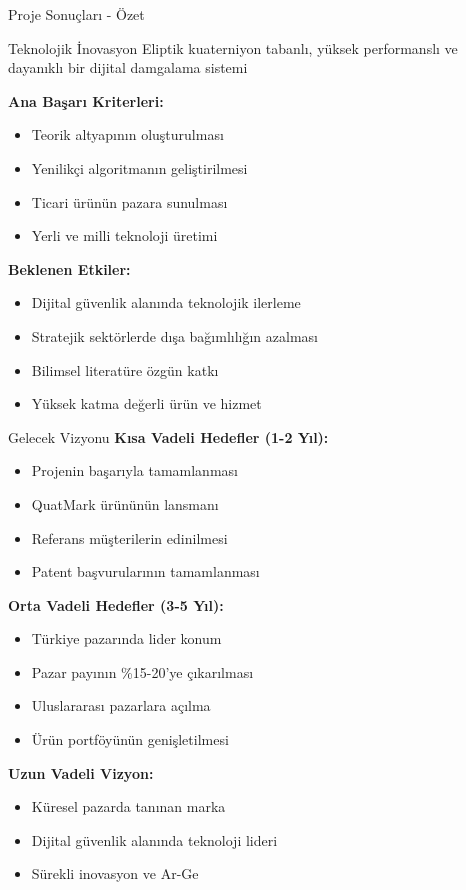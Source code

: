\documentclass[aspectratio=169,xcolor={dvipsnames}]{beamer}
\begin{document}
\begin{frame}{Proje Sonuçları - Özet}
\begin{block}{Teknolojik İnovasyon}
Eliptik kuaterniyon tabanlı, yüksek performanslı ve dayanıklı bir dijital damgalama sistemi
\end{block}

\textbf{Ana Başarı Kriterleri:}
\begin{itemize}
\item Teorik altyapının oluşturulması
\item Yenilikçi algoritmanın geliştirilmesi
\item Ticari ürünün pazara sunulması
\item Yerli ve milli teknoloji üretimi
\end{itemize}

\vspace{0.3cm}

\textbf{Beklenen Etkiler:}
\begin{itemize}
\item Dijital güvenlik alanında teknolojik ilerleme
\item Stratejik sektörlerde dışa bağımlılığın azalması
\item Bilimsel literatüre özgün katkı
\item Yüksek katma değerli ürün ve hizmet
\end{itemize}
\end{frame}

\begin{frame}{Gelecek Vizyonu}
\textbf{Kısa Vadeli Hedefler (1-2 Yıl):}
\begin{itemize}
\item Projenin başarıyla tamamlanması
\item QuatMark ürününün lansmanı
\item Referans müşterilerin edinilmesi
\item Patent başvurularının tamamlanması
\end{itemize}

\textbf{Orta Vadeli Hedefler (3-5 Yıl):}
\begin{itemize}
\item Türkiye pazarında lider konum
\item Pazar payının \%15-20'ye çıkarılması
\item Uluslararası pazarlara açılma
\item Ürün portföyünün genişletilmesi
\end{itemize}

\textbf{Uzun Vadeli Vizyon:}
\begin{itemize}
\item Küresel pazarda tanınan marka
\item Dijital güvenlik alanında teknoloji lideri
\item Sürekli inovasyon ve Ar-Ge
\end{itemize}
\end{frame}
\end{document}

